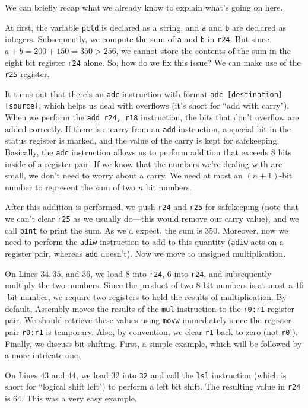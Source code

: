 We can briefly recap what we already know to explain what's going on here.


At first, the variable \verb!pctd! is declared as a string, and \verb!a! and \verb!b! are declared as integers. Subsequently, we compute the sum of \verb!a! and \verb!b! in \verb!r24!. But since $a + b = 200 + 150 = 350 > 256$, we cannot store the contents of the sum in the eight bit register \verb!r24! alone. So, how do we fix this issue? We can make use of the \verb!r25! register.

It turns out that there's an \verb!adc! instruction with format \verb!adc [destination] [source]!, which helps us deal with overflows (it's short for ``add with carry"). When we perform the \verb!add r24, r18! instruction, the bits that don't overflow are added correctly. If there is a carry from an \verb!add! instruction, a special bit in the status register is marked, and the value of the carry is kept for safekeeping. Basically, the \verb!adc! instruction allows us to perform addition that exceeds $8$ bits inside of a register pair. If we know that the numbers we're dealing with are small, we don't need to worry about a carry. We need at most an $(n + 1)$-bit number to represent the sum of two $n$ bit numbers.


After this addition is performed, we push \verb!r24! and \verb!r25! for safekeeping (note that we can't clear \verb!r25! as we usually do---this would remove our carry value), and we call \verb!pint! to print the sum. As we'd expect, the sum is $350$. Moreover, now we need to perform the \verb!adiw! instruction to add to this quantity (\verb!adiw! acts on a register pair, whereas \verb!add! doesn't). Now we move to unsigned multiplication.



On Lines $34, 35$, and $36$, we load $8$ into \verb!r24!, $6$ into \verb!r24!, and subsequently multiply the two numbers. Since the product of two $8$-bit numbers is at most a $16$-bit number, we require two registers to hold the results of multiplication. By default, Assembly moves the results of the \verb!mul! instruction to the \verb!r0:r1! register pair. We should retrieve these values using \verb!movw! immediately since the register pair \verb!r0:r1! is temporary. Also, by convention, we clear \verb!r1! back to zero (not \verb!r0!!). Finally, we discuss bit-shifting. First, a simple example, which will be followed by a more intricate one.

On Lines $43$ and $44$, we load $32$ into \verb!32! and call the \verb!lsl! instruction (which is short for ``logical shift left") to perform a left bit shift. The resulting value in \verb!r24! is $64$. This was a very easy example.



